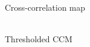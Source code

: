 \documentclass[t, xcolor={dvipsnames}]{beamer}
\begin{document}
\begin{frame}[fragile]
\begin{figure}[!tbp]
\begin{minipage}[c]{0.3\textwidth}
        \\
        {\tiny Cross-correlation map}
      \end{minipage}
      \hfill
      \begin{minipage}[c]{0.3\textwidth}
        \\
        {\tiny Thresholded CCM}
      \end{minipage}
    \end{figure}
\end{frame}
\end{document}
